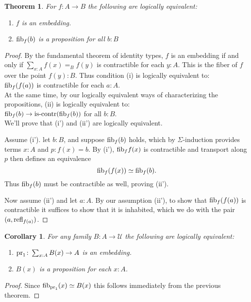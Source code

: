 \documentclass{amsart}
\theoremstyle{theorem}
\newtheorem*{thm}{Theorem}
\newtheorem*{cor}{Corollary}
\theoremstyle{definition}
\theoremstyle{remark}
\newcommand{\0}{\mathbbe{0}}
\newcommand{\1}{\mathbbe{1}}
\newcommand{\2}{\mathbbe{2}}
\newcommand{\3}{\mathbbe{3}}
\newcommand{\4}{\mathbbe{4}}
\newcommand{\term}[1]{{\textup{#1}}}
\newcommand{\type}[1]{{\textup{#1}}}
\newcommand{\pr}{\term{pr}}
\newcommand{\refl}{\term{refl}}
\newcommand{\UU}{{\mathcal{U}}}
\newcommand{\iscontr}{\type{is-contr}}
\newcommand{\fib}{\type{fib}}
\begin{document}
\begin{thm} For $f : A \to B$ the following are logically equivalent:
\begin{enumerate}
\item $f$ is an embedding.
\item $\fib_f(b)$ is a proposition for all $b : B$
\end{enumerate}
\end{thm}
\begin{proof}
By the fundamental theorem of identity types, $f$ is an embedding if and only if $\sum_{x:A}f(x)=_B f(y)$ is contractible for each $y :A$. This is the fiber of $f$ over the point $f(y) : B$. Thus condition (i) is logically equivalent to:\\
 $\fib_f(f(a))$ is contractible for each $a : A$.\\
At the same time, by our logically equivalent ways of characterizing the propositions, (ii) is logically equivalent to:
\\
 $\fib_f(b) \to \iscontr{(\fib_f(b))}$ for all $b : B$.\\
We'll prove that (i') and (ii') are logically equivalent.

Assume (i'). let $b : B$, and suppose $\fib_f(b)$ holds, which by $\Sigma$-induction provides terms $x:A$ and $p : f(x) = b$. By (i'), $\fib_ff(x)$ is contractible and transport along $p$ then defines an equivalence
\[ \fib_f(f(x)) \simeq \fib_f(b).\]
Thus $\fib_f(b)$ must be contractible as well, proving (ii').

Now assume (ii') and let $a : A$. By our assumption (ii'), to show that $\fib_f(f(a))$ is contractible it suffices to show that it is inhabited, which we do with the pair $(a, \refl_{f(a)})$.
\end{proof}

\begin{cor} For any family $B : A \to \UU$ the following are logically equivalent:
\begin{enumerate}
\item $\pr_1 \colon \sum_{x:A} B(x) \to A$ is an embedding.
\item $B(x)$ is a proposition for each $x:A$.
\end{enumerate}
\end{cor}
\begin{proof}
Since $\fib_{\pr_1}(x) \simeq B(x)$ this follows immediately from the previous theorem.
\end{proof}
\end{document}
